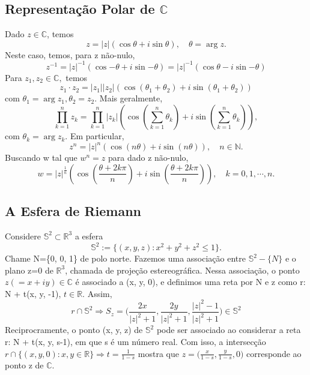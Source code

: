 \documentclass{article}
\begin{document}
  \subsection{Representa\c c\~ao Polar de $\mathbb{C}$}
  Dado $z\in \mathbb{C}$, temos 
  $$
  z = |z|(\cos{\theta} + i\sin{\theta}), \quad \theta = \arg z.
  $$
  Neste caso, temos, para z n\~ao-nulo,
  $$
  z ^{-1} = |z|^{-1}(\cos{-\theta} + i\sin{-\theta}) = |z|^{-1}(\cos{\theta}-i\sin{-\theta})
  $$
  Para $z _{1}, z _{2}\in \mathbb{C},$ temos
  $$
  z _{1}\cdot z _{2} = |z _{1}||z _{2}|(\cos(\theta _{1} + \theta _{2}) + i\sin(\theta _{1} + \theta _{2}))
  $$
com $\theta _{1} = \arg z _{1}, \theta _{2} = z _{2}.$ Mais geralmente, 
  $$
  \prod_{k=1}^{n}z _{k} = \prod_{k=1}^{n} |z _{k}|(\cos(\sum_{k=1}^{n}\theta _{k}) + i\sin(\sum_{k=1}^{n}\theta _{k})),
  $$
com $\theta _{k} = \arg z _{k}$. Em particular, 
  $$
  z ^{n} = |z|^{n}(\cos(n\theta)+i\sin(n \theta)), \quad n\in \mathbb{N}.
  $$
  Buscando w tal que $w ^{n} = z$ para dado z n\~ao-nulo,
  $$
  w = |z|^{\frac{1}{n}}(\cos(\frac{\theta + 2k\pi}{n}) + i\sin(\frac{\theta + 2k\pi}{n})), \quad k = 0, 1, \cdots, n.
  $$

  \subsection{A Esfera de Riemann}
  Considere $\mathbb{S}^{2}\subset{\mathbb{R}^{3}}$ a esfera 
  $$
  \mathbb{S}^{2}:= \{(x, y, z): x ^{2} + y ^{2} + z ^{2}\leq{1}\}.
  $$
  Chame N=\{0, 0, 1\} de polo norte. Fazemos uma associa\c c\~ao entre $\mathbb{S}^{2}-\{N\}$ e o plano z=0 de $\mathbb{R}^{3}$,
chamada de proje\c c\~ao estereogr\'afica. Nessa associa\c c\~ao, o ponto $z(=x + iy)\in\mathbb{C}$ \'e associado a (x, y, 0), e
definimos uma reta por N e z como r: N + t(x, y, -1), $t\in \mathbb{R}$. Assim,
  $$
  r\cap{\mathbb{S}^{2}} \Rightarrow S _{z} = \biggl(\frac{2x}{|z|^{2}+1}, \frac{2y}{|z|^{2}+1}, \frac{|z|^{2}-1}{|z|^{2}+1}\biggr)\in \mathbb{S}^{2}
  $$
  Reciprocramente, o ponto (x, y, z) de $\mathbb{S}^{2}$ pode ser associado ao considerar a reta r: N + t(x, y, s-1), em que
s \'e um n\'umero real. Com isso, a intersec\c c\~ao $r\cap \{(x, y, 0): x, y \in \mathbb{R}\}\Rightarrow t=\frac{1}{1-s}$ mostra que 
$z = \biggl(\frac{x}{1-s}, \frac{y}{1-s}, 0\biggr)$ corresponde ao ponto z de $\mathbb{C}$.
  
\end{document}
